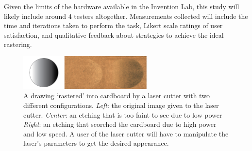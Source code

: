 \documentclass[12pt]{memoir}
\begin{document}
Given the limits of the hardware available in the Invention Lab, this study will likely include around 4 testers altogether.
Measurements collected will include the time and iterations taken to perform the task, Likert scale ratings of user satisfaction, and qualitative feedback about strategies to achieve the ideal rastering.

\begin{figure}
  \centering
  \includegraphics[width=0.6\textwidth]{figures/rasters}
  \caption{\scriptsize{%
  A drawing `rastered' into cardboard by a laser cutter with two different configurations.
  \emph{Left}: the original image given to the laser cutter.
  \emph{Center}: an etching that is too faint to see due to low power
  \emph{Right}: an etching that scorched the cardboard due to high power and low speed.
  A user of the laser cutter will have to manipulate the laser's parameters to get the desired appearance.}}
\label{fig:rasters}
\end{figure}
\end{document}

